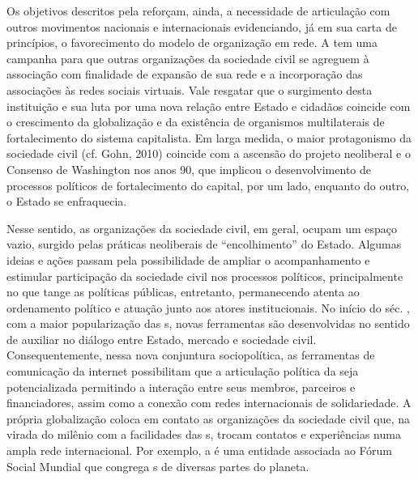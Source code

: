 Os objetivos descritos pela  reforçam, ainda, a necessidade de
articulação com outros movimentos nacionais e internacionais
evidenciando, já em sua carta de princípios, o favorecimento do modelo
de organização em rede. A  tem uma campanha para que outras
organizações da sociedade civil se agreguem à associação com finalidade
de expansão de sua rede e a incorporação das associações às redes
sociais virtuais. Vale resgatar que o surgimento desta instituição e sua
luta por uma nova relação entre Estado e cidadãos coincide com o
crescimento da globalização e da existência de organismos multilaterais
de fortalecimento do sistema capitalista. Em larga medida, o maior
protagonismo da sociedade civil (cf. Gohn, 2010) coincide com a ascensão
do projeto neoliberal e o Consenso de Washington nos anos 90, que
implicou o desenvolvimento de processos políticos de fortalecimento do
capital, por um lado, enquanto do outro, o Estado se enfraquecia.

Nesse sentido, as organizações da sociedade civil, em geral, ocupam um
espaço vazio, surgido pelas práticas neoliberais de ``encolhimento'' do
Estado. Algumas ideias e ações passam pela possibilidade de ampliar o
acompanhamento e estimular participação da sociedade civil nos processos
políticos, principalmente no que tange as políticas públicas,
entretanto, permanecendo atenta ao ordenamento político e atuação junto
aos atores institucionais. No início do séc. , com a maior
popularização das s, novas ferramentas são desenvolvidas no sentido
de auxiliar no diálogo entre Estado, mercado e sociedade civil.
Consequentemente, nessa nova conjuntura sociopolítica, as ferramentas de
comunicação da internet possibilitam que a articulação política da 
seja potencializada permitindo a interação entre seus membros, parceiros
e financiadores, assim como a conexão com redes internacionais de
solidariedade. A própria globalização coloca em contato as organizações
da sociedade civil que, na virada do milênio com a facilidades das s,
trocam contatos e experiências numa ampla rede internacional. Por
exemplo, a  é uma entidade associada ao Fórum Social Mundial que
congrega s de diversas partes do planeta.


